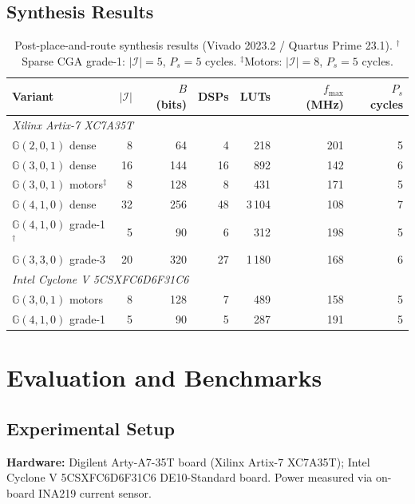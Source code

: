 \documentclass[11pt,a4paper]{article}
\theoremstyle{definition}
\theoremstyle{plain}
\theoremstyle{remark}
\newcommand{\GA}{\mathbb{G}}
\begin{document}
\subsection{Synthesis Results}

\begin{table}[h]
\centering
\caption{Post-place-and-route synthesis results (Vivado 2023.2 / Quartus Prime 23.1).
$^\dagger$Sparse CGA grade-1: $|\mathcal{I}|=5$, $P_s=5$ cycles.
$^\ddagger$Motors: $|\mathcal{I}|=8$, $P_s=5$ cycles.}
\label{tab:synth}
\small
\begin{tabular}{lrrrrrr}
\toprule
Variant & $|\mathcal{I}|$ & $B$ (bits) & DSPs & LUTs & $f_\mathrm{max}$ (MHz) & $P_s$ cycles \\
\midrule
\multicolumn{7}{l}{\emph{Xilinx Artix-7 XC7A35T}} \\
$\GA(2,0,1)$ dense & 8 & 64 & 4 & 218 & 201 & 5 \\
$\GA(3,0,1)$ dense & 16 & 144 & 16 & 892 & 142 & 6 \\
$\GA(3,0,1)$ motors$^\ddagger$ & 8 & 128 & 8 & 431 & 171 & 5 \\
$\GA(4,1,0)$ dense & 32 & 256 & 48 & 3\,104 & 108 & 7 \\
$\GA(4,1,0)$ grade-1$^\dagger$ & 5 & 90 & 6 & 312 & 198 & 5 \\
$\GA(3,3,0)$ grade-3 & 20 & 320 & 27 & 1\,180 & 168 & 6 \\
\midrule
\multicolumn{7}{l}{\emph{Intel Cyclone V 5CSXFC6D6F31C6}} \\
$\GA(3,0,1)$ motors & 8 & 128 & 7 & 489 & 158 & 5 \\
$\GA(4,1,0)$ grade-1 & 5 & 90 & 5 & 287 & 191 & 5 \\
\bottomrule
\end{tabular}
\end{table}

\section{Evaluation and Benchmarks}
\label{sec:eval}

\subsection{Experimental Setup}

\textbf{Hardware:}
Digilent Arty-A7-35T board (Xilinx Artix-7 XC7A35T);
Intel Cyclone V 5CSXFC6D6F31C6 DE10-Standard board.
Power measured via on-board INA219 current sensor.
\end{document}
